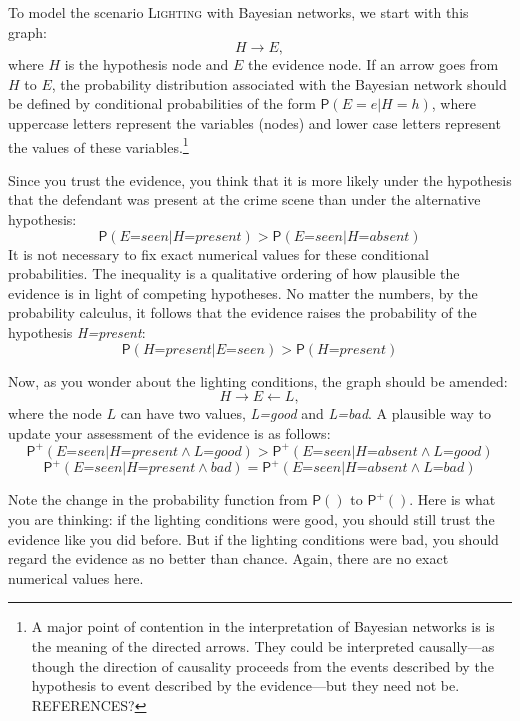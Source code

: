 \documentclass[
  11pt,
  dvipsnames,enabledeprecatedfontcommands]{scrartcl}
\newcommand{\pr}[1]{\ensuremath{\mathsf{P}(#1)}}
\newcommand{\ppr}[2]{\ensuremath{\mathsf{P}^{#1}(#2)}}
\begin{document}
To model the scenario \textsc{Lighting} with Bayesian networks, we start
with this graph: \[H \rightarrow E,\] where \(H\) is the hypothesis node
and \(E\) the evidence node. If an arrow goes from \(H\) to \(E\), the
probability distribution associated with the Bayesian network should be
defined by conditional probabilities of the form \(\pr{E=e \vert H=h}\),
where uppercase letters represent the variables (nodes) and lower case
letters represent the values of these variables.\footnote{A major point
  of contention in the interpretation of Bayesian networks is is the
  meaning of the directed arrows. They could be interpreted
  causally---as though the direction of causality proceeds from the
  events described by the hypothesis to event described by the
  evidence---but they need not be. REFERENCES?}

Since you trust the evidence, you think that it is more likely under the
hypothesis that the defendant was present at the crime scene than under
the alternative hypothesis:
\[\pr{\textit{E=seen} \vert \textit{H=present}} > \pr{\textit{E=seen} \vert \textit{H=absent}}\]
It is not necessary to fix exact numerical values for these conditional
probabilities. The inequality is a qualitative ordering of how plausible
the evidence is in light of competing hypotheses. No matter the numbers,
by the probability calculus, it follows that the evidence raises the
probability of the hypothesis \textit{H=present}:
\[\pr{\textit{H=present}\vert \textit{E=seen}} > \pr{\textit{H=present}}\]

\noindent Now, as you wonder about the lighting conditions, the graph
should be amended: \[H \rightarrow E \leftarrow L,\] where the node
\(L\) can have two values, \textit{L=good} and \textit{L=bad}. A
plausible way to update your assessment of the evidence is as follows:
\[\ppr{+}{\textit{E=seen} \vert \textit{H=present} \wedge \textit{L=good}} > \ppr{+}{\textit{E=seen} \vert \textit{H=absent} \wedge \textit{L=good}}\]
\[\ppr{+}{\textit{E=seen} \vert \textit{H=present} \wedge \textit{bad}} = \ppr{+}{\textit{E=seen} \vert \textit{H=absent} \wedge \textit{L=bad}}\]

\noindent Note the change in the probability function from \(\pr{}\) to
\(\ppr{+}{}\). Here is what you are thinking: if the lighting conditions
were good, you should still trust the evidence like you did before. But
if the lighting conditions were bad, you should regard the evidence as
no better than chance. Again, there are no exact numerical values here.
\end{document}
